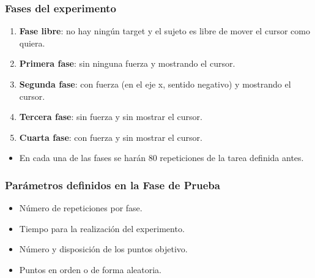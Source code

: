 \documentclass{beamer}
\begin{document}
\begin{frame}
	\frametitle{Fases del experimento}

	\begin{enumerate}
		\item \textbf{Fase libre}: no hay ningún target y el sujeto es libre de mover el cursor como quiera. 
		\item \textbf{Primera fase}: sin ninguna fuerza y mostrando el cursor.
		\item \textbf{Segunda fase}: con fuerza (en el eje x, sentido negativo) y mostrando el cursor.
		\item \textbf{Tercera fase}: sin fuerza y sin mostrar el cursor.
		\item \textbf{Cuarta fase}: con fuerza y sin mostrar el cursor.
	\end{enumerate}	
	\begin{itemize}
		\item En cada una de las fases se harán 80 repeticiones de la tarea definida antes.
	\end{itemize}
\end{frame}
\begin{frame}
	\frametitle{Parámetros definidos en la Fase de Prueba}
	
	\begin{itemize}
		\item Número de repeticiones por fase. 
		\item Tiempo para la realización del experimento.
		\item Número y disposición de los puntos objetivo.
		\item Puntos en orden o de forma aleatoria.
	\end{itemize}	
\begin{figure}
	\centering
\end{figure}

\end{frame}
\end{document}
